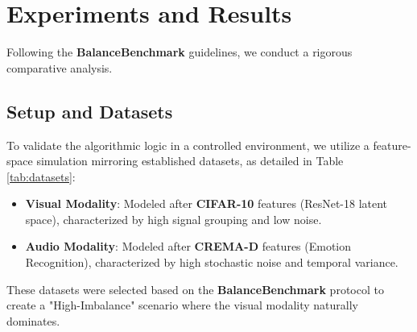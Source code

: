 \documentclass[10pt, twocolumn, letterpaper]{article}
\begin{document}
\section{Experiments and Results}

Following the \textbf{BalanceBenchmark} guidelines, we conduct a rigorous comparative analysis.

\subsection{Setup and Datasets}
To validate the algorithmic logic in a controlled environment, we utilize a feature-space simulation mirroring established datasets, as detailed in Table \ref{tab:datasets}:
\begin{itemize}
    \item \textbf{Visual Modality}: Modeled after \textbf{CIFAR-10} \cite{cifar10} features (ResNet-18 latent space), characterized by high signal grouping and low noise.
    \item \textbf{Audio Modality}: Modeled after \textbf{CREMA-D} \cite{cremad} features (Emotion Recognition), characterized by high stochastic noise and temporal variance.
\end{itemize}
These datasets were selected based on the \textbf{BalanceBenchmark} \cite{balancebenchmark} protocol to create a "High-Imbalance" scenario where the visual modality naturally dominates.

\begin{table}[h]
\centering
{}
\caption{\textbf{Benchmark Dataset Specifications.} We align our feature simulation with the statistical moments of these standard datasets to ensure realistic imbalance dynamics.}
\label{tab:datasets}
\end{table}
\end{document}
